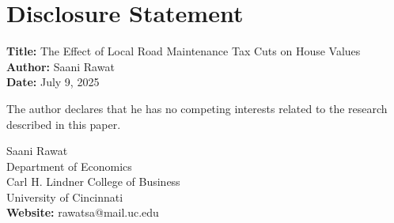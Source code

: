 \documentclass[12pt]{article}
\begin{document}
\section*{\centering Disclosure Statement}

\begin{center}
\textbf{Title:} The Effect of Local Road Maintenance Tax Cuts on House Values \\
\textbf{Author:} Saani Rawat \\
\textbf{Date:} July 9, 2025
\end{center}

\begin{flushleft}

The author declares that he has no competing interests related to the research described in this paper.

\vspace{1cm}


Saani Rawat \\
Department of Economics \\
Carl H. Lindner College of Business \\
University of Cincinnati \\
\textbf{Website:} rawatsa@mail.uc.edu
\end{flushleft}
\end{document}
